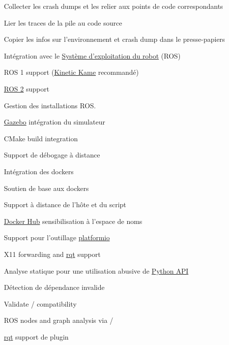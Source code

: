 {\begin{multicols}{2}
\begin{todolist}
\item Collecter les crash dumps et les relier aux points de code correspondants
\begin{todolist}
\item Lier les traces de la pile au code source
\item Copier les infos sur l'environnement et crash dump dans le presse-papiers
\end{todolist}
\item Intégration avec le \href{https://www.ros.org}{Système d'exploitation du robot} (ROS)
\begin{todolist}
\item[\done] ROS 1 support (\href{https://wiki.ros.org/kinetic}{Kinetic Kame} recommandé)
\item \href{https://github.com/ros2/ros2/wiki}{ROS 2} support
\item[\done] Gestion des installations ROS.
\end{todolist}
\item[\done] \href{http://gazebosim.org/}{Gazebo} intégration du simulateur
\item CMake build integration
\item Support de débogage à distance
\item Intégration des dockers
\begin{todolist}
\item[\done] Soutien de base aux dockers
\item Support à distance de l'hôte et du script
\item \href{https://hub.docker.com}{Docker Hub} sensibilisation à l'espace de noms
\item Support pour l'outillage \href{https://platformio.org}{platformio}
\item X11 forwarding and \href{https://wiki.ros.org/rqt}{rqt} support
\end{todolist}
\item Analyse statique pour une utilisation abusive de \href{https://wiki.ros.org/rospy}{Python API}
\begin{todolist}
\item Détection de dépendance invalide
\item Validate / compatibility
\item ROS nodes and graph analysis via \href{https://wiki.ros.org/rosdep}{}/\href{https://wiki.ros.org/rqt_dep}{}
\end{todolist}
\item[\done] \href{https://wiki.ros.org/rqt}{rqt} support de plugin

\end{todolist}
\end{multicols}}
